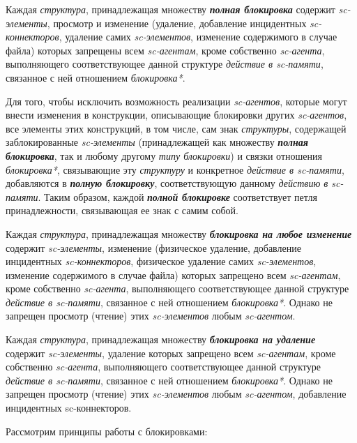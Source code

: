 Каждая \textit{структура}, принадлежащая множеству \textbf{\textit{полная блокировка}} содержит \textit{sc-элементы}, просмотр и изменение (удаление, добавление инцидентных \textit{sc-коннекторов}, удаление самих \textit{sc-элементов}, изменение содержимого в случае файла) которых запрещены всем \textit{sc-агентам}, кроме собственно \textit{sc-агента}, выполняющего соответствующее данной структуре \textit{действие в sc-памяти}, связанное с ней отношением \textit{блокировка*}.
	
Для того, чтобы исключить возможность реализации \textit{sc-агентов}, которые могут внести изменения в конструкции, описывающие блокировки других \textit{sc-агентов}, все элементы этих конструкций, в том числе, сам знак \textit{структуры}, содержащей заблокированные \textit{sc-элементы} (принадлежащей как множеству \textbf{\textit{полная блокировка}}, так и любому другому \textit{типу блокировки}) и связки отношения \textit{блокировка*}, связывающие эту \textit{структуру} и конкретное \textit{действие в sc-памяти}, добавляются в \textbf{\textit{полную блокировку}}, соответствующую данному \textit{действию в sc-памяти}. Таким образом, каждой \textbf{\textit{полной блокировке}} соответствует петля принадлежности, связывающая ее знак с самим собой.

Каждая \textit{структура}, принадлежащая множеству \textbf{\textit{блокировка на любое изменение}} содержит \textit{sc-элементы}, изменение (физическое удаление, добавление инцидентных \textit{sc-коннекторов}, физическое удаление самих \textit{\mbox{sc-элементов}}, изменение содержимого в случае файла) которых запрещено всем \textit{sc-агентам}, кроме собственно \textit{sc-агента}, выполняющего соответствующее данной структуре \textit{действие в sc-памяти}, связанное с ней отношением \textit{блокировка*}. Однако не запрещен просмотр (чтение) этих \textit{sc-элементов} любым \textit{sc-агентом}.

Каждая \textit{структура}, принадлежащая множеству \textbf{\textit{блокировка на удаление}} содержит \textit{sc-элементы}, удаление которых запрещено всем \textit{sc-агентам}, кроме собственно \textit{sc-агента}, выполняющего соответствующее данной структуре \textit{действие в sc-памяти}, связанное с ней отношением \textit{блокировка*}. Однако не запрещен просмотр (чтение) этих \textit{sc-элементов} любым \textit{sc-агентом}, добавление инцидентных sc-коннекторов.

Рассмотрим принципы работы с блокировками:

